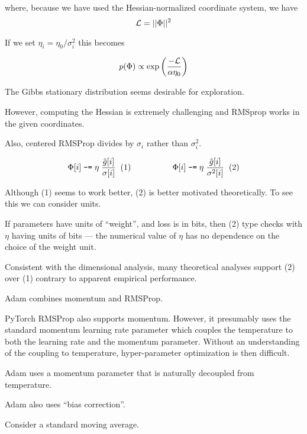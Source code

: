 {\vfill
where, because we have used the Hessian-normalized coordinate system, we have 
$${\cal L} = ||\Phi||^2$$


If we set $\eta_i = \eta_0/\sigma_i^2$ this becomes

$$p(\Phi) \propto \exp\left(\frac{-{\cal L}}{\alpha\eta_0}\right)$$

\vfill
The Gibbs stationary distribution seems desirable for exploration.


However, computing the Hessian is extremely challenging and RMSprop works in the given coordinates.

\vfill
Also, centered RMSProp divides by $\sigma_i$ rather than $\sigma_i^2$.


{\color{red} $$\Phi[i] \;\mbox{\tt -=} \; \eta\;\frac{\hat{g}[i]}{\sigma[i]}\;\;(1)\hspace{5em}\Phi[i] \;\mbox{\tt -=} \; \eta\;\frac{\hat{g}[i]}{\sigma^2[i]}\;\;(2)$$}

\vfill
Although (1) seems to work better, (2) is better motivated theoretically.  To see this we can consider units.

\vfill
If parameters have units of ``weight'', and loss is in bits, then (2) type checks with $\eta$ having units of bits --- the numerical value of $\eta$
has no dependence on the choice of the weight unit.

\vfill
Consistent with the dimensional analysis, many theoretical analyses support (2) over (1) contrary to apparent empirical performance.


Adam combines momentum and RMSProp.

\vfill
PyTorch RMSProp also supports momentum.  However, it presumably uses the standard momentum learning rate parameter which couples the temperature to both
the learning rate and the momentum parameter.  Without an understanding of the coupling to temperature, hyper-parameter optimization is then difficult.

\vfill
Adam uses a momentum parameter that is naturally decoupled from temperature.

\vfill
Adam also uses ``bias correction''.


Consider a standard moving average.

}
